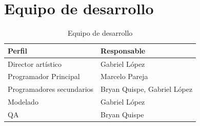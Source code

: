 \section{Equipo de desarrollo}

\begin{table}[H]
    \centering
    \begin{tabular}{|p{5cm}|p{6cm}|}
        \hline
        \textbf{Perfil} & \textbf{Responsable} \\
        \hline
        Director artístico & Gabriel López \\
        \hline
        Programador Principal & Marcelo Pareja \\
        \hline
        Programadores secundarios & Bryan Quispe, Gabriel López \\
        \hline
        Modelado & Gabriel López \\
        \hline
        QA & Bryan Quispe \\
        \hline
    \end{tabular}
    \caption{Equipo de desarrollo}
    \label{tab:equipo_desarrollo}
\end{table}

